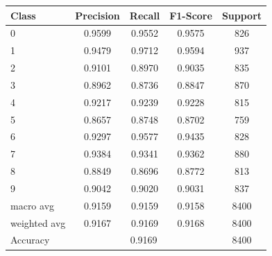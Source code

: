 \begin{tabular}{lcccc}
\toprule
Class & Precision & Recall & F1-Score & Support \\
\midrule
  0 & 0.9599 & 0.9552 & 0.9575 & 826 \\
  1 & 0.9479 & 0.9712 & 0.9594 & 937 \\
  2 & 0.9101 & 0.8970 & 0.9035 & 835 \\
  3 & 0.8962 & 0.8736 & 0.8847 & 870 \\
  4 & 0.9217 & 0.9239 & 0.9228 & 815 \\
  5 & 0.8657 & 0.8748 & 0.8702 & 759 \\
  6 & 0.9297 & 0.9577 & 0.9435 & 828 \\
  7 & 0.9384 & 0.9341 & 0.9362 & 880 \\
  8 & 0.8849 & 0.8696 & 0.8772 & 813 \\
  9 & 0.9042 & 0.9020 & 0.9031 & 837 \\
\midrule
  macro avg & 0.9159 & 0.9159 & 0.9158 & 8400 \\
  weighted avg & 0.9167 & 0.9169 & 0.9168 & 8400 \\
\midrule
  Accuracy & \multicolumn{3}{c}{0.9169} & 8400 \\
\bottomrule
\end{tabular}